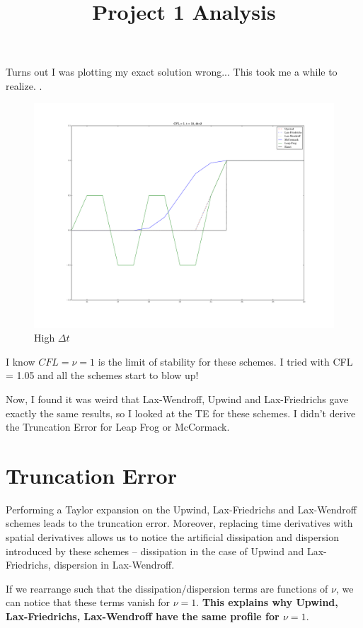 \documentclass[a4paper]{article}
\title{Project 1 Analysis}
\begin{document}
\maketitle
Turns out I was plotting my exact solution wrong... This took me a while to realize. .
\begin{figure}
    \centering
    \includegraphics[width=1.0\textwidth]{highdt.pdf}
    \caption{High $\Delta t$}\label{fig:highdt}
\end{figure}

I know $CFL = \nu = 1$ is the limit of stability for these schemes. I tried with CFL = 1.05 and all the schemes start to blow up!

Now, I found it was weird that Lax-Wendroff, Upwind and Lax-Friedrichs gave exactly the same results, so I looked at the TE for these schemes. I didn't derive the Truncation Error for Leap Frog or McCormack.

\section{Truncation Error}

Performing a Taylor expansion on the Upwind, Lax-Friedrichs and Lax-Wendroff schemes leads to the truncation error. Moreover, replacing time derivatives with spatial derivatives allows us to notice the artificial dissipation and dispersion introduced by these schemes -- dissipation in the case of Upwind and Lax-Friedrichs, dispersion in Lax-Wendroff.

If we rearrange such that the dissipation/dispersion terms are functions of $\nu$, we can notice that these terms vanish for $\nu = 1$. \textbf{This explains why Upwind, Lax-Friedrichs, Lax-Wendroff have the same profile for $\nu = 1$}.
\end{document}
